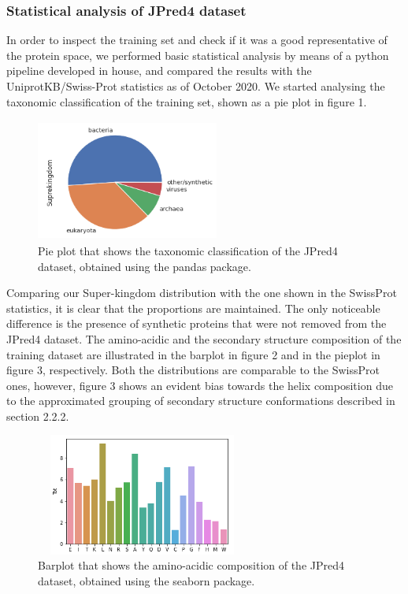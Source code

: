 \documentclass[nocrop]{bioinfo}
\begin{document}
\begin{methods}
\subsubsection{Statistical analysis of JPred4 dataset}
In order to inspect the training set and check if it was a good representative of the protein space, we performed basic statistical analysis by means of a python pipeline developed in house, and compared the results with the UniprotKB/Swiss-Prot statistics as of October 2020.
We started analysing the taxonomic classification of the training set, shown as a pie plot in figure 1. 
\vspace{-15pt}
\begin{figure}[!tbh]%
\centering
\includegraphics[width=6cm, height=4cm]{./plotsJPred4/Superkingdom.png}
\vspace{-15pt}
\caption{Pie plot that shows the taxonomic classification of the JPred4 dataset, obtained using the pandas package.}\label{fig:01}
\end{figure}
\vspace{-8pt}
Comparing our Super-kingdom distribution with the one shown in the SwissProt statistics, it is clear that the proportions are maintained. The only noticeable difference is the presence of synthetic proteins that were not removed from the JPred4 dataset.
The amino-acidic and the secondary structure composition of the training dataset are illustrated in the barplot in figure 2 and in the pieplot in figure 3, respectively. Both the distributions are comparable to the SwissProt ones, however, figure 3 shows an evident bias towards the helix composition due to the approximated grouping of secondary structure conformations described in section 2.2.2.
\begin{figure}[!tbh]%
\centering
\includegraphics[width=7cm, height=4cm]{./plotsJPred4/aa_composition.png}
\vspace{-15pt}
\caption{Barplot that shows the amino-acidic composition of the JPred4 dataset, obtained using the seaborn package.}\label{fig:02}
\end{figure}


\end{methods}
\end{document}
